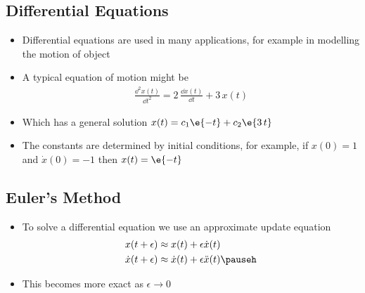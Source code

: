 
\begin{slide}
\section{Differential Equations}

\begin{PauseHighLight}
  \begin{itemize}
  \item Differential equations are used in many applications, for
    example in modelling the motion of object\pause
  \item A typical equation of motion might be
    \begin{align*}
      \frac{\dd^2 x(t)}{\dd t^2} = 2\,\frac{\dd x(t)}{\dd t} + 3\,x(t)
    \end{align*}
  \item Which has a general solution $x(t) = c_1 \e{-t} + c_2 \e{3\,t}$\pause
  \item The constants are determined by initial conditions, for example,
    if $x(0) =1$ and $\dot{x}(0) = -1$ then $x(t) = \e{-t}$\pause
  \end{itemize}
\end{PauseHighLight}

\end{slide}


\begin{slide}
\section[-2]{Euler's Method}

\pb\pause{}
\begin{itemize}
\item To solve a differential equation we use an approximate
  update equation
  \begin{align*}
    x(t+\epsilon) &\approx x(t) + \epsilon \dot{x}(t) \\
    \dot{x}(t+\epsilon) &\approx \dot{x}(t) + \epsilon \ddot{x}(t)\pauseh
  \end{align*}
\item This becomes more exact as $\epsilon\rightarrow 0$\pauseh
  \begin{center}
    \pause
  \end{center}
\end{itemize}

\end{slide}


